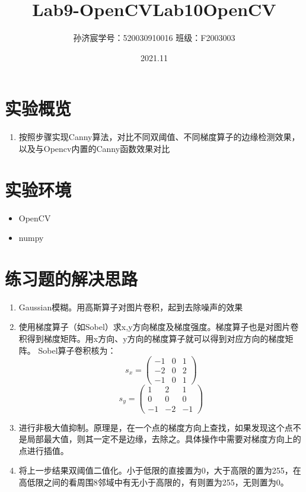 \documentclass[12pt,a4paper]{article}
\title{Lab9-OpenCV}
\title{Lab10\quad OpenCV}
\date{2021.11}
\author{孙济宸\quad \quad 学号：520030910016 \quad  \quad 班级：F2003003}
\begin{document}
\maketitle
\section{实验概览}
\begin{enumerate}
\item 按照步骤实现Canny算法，对比不同双阈值、不同梯度算子的边缘检测效果，以及与Opencv内置的Canny函数效果对比
\end{enumerate}
\section{实验环境}
\begin{itemize}
	\item OpenCV
	\item numpy

\end{itemize}
\newpage

\section{练习题的解决思路}
\begin{enumerate}


\item Gaussian模糊。用高斯算子对图片卷积，起到去除噪声的效果
\item 使用梯度算子（如Sobel）求x,y方向梯度及梯度强度。梯度算子也是对图片卷积得到梯度矩阵。用x方向、y方向的梯度算子就可以得到对应方向的梯度矩阵。 Sobel算子卷积核为：
$$s_x=
\begin{pmatrix}
 -1 & 0 & 1 \\
 -2 & 0 & 2 \\
 -1 & 0 & 1
\end{pmatrix}
$$
$$s_y=
\begin{pmatrix}
 1 & 2 & 1 \\
 0 & 0 & 0 \\
 -1 & -2 & -1
\end{pmatrix}
$$
\item 进行非极大值抑制。原理是，在一个点的梯度方向上查找，如果发现这个点不是局部最大值，则其一定不是边缘，去除之。具体操作中需要对梯度方向上的点进行插值。
\item 将上一步结果双阈值二值化。小于低限的直接置为0，大于高限的置为255，在高低限之间的看周围8邻域中有无小于高限的，有则置为255，无则置为0。
\end{enumerate}
\end{document}
